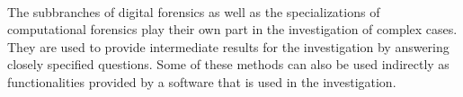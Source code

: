 %
%
%
%
%
%
%
%
%
%
%
%		
%
%
%
%
%
%



\paragraph{} The subbranches of digital forensics as well as the specializations of computational forensics play their own part in the investigation of complex cases. They are used to provide intermediate results for the investigation by answering closely specified questions. Some of these methods can also be used indirectly as functionalities provided by a software that is used in the investigation.  

